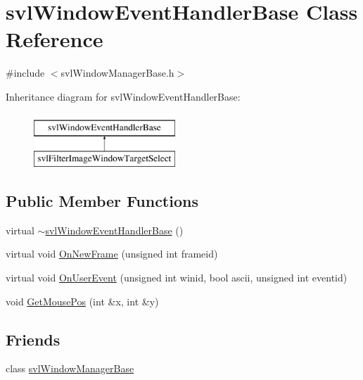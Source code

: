 \hypertarget{classsvl_window_event_handler_base}{}\section{svl\+Window\+Event\+Handler\+Base Class Reference}
\label{classsvl_window_event_handler_base}


{\ttfamily \#include $<$svl\+Window\+Manager\+Base.\+h$>$}

Inheritance diagram for svl\+Window\+Event\+Handler\+Base\+:\begin{figure}[H]
\begin{center}
\leavevmode
\includegraphics[height=2.000000cm]{d9/d07/classsvl_window_event_handler_base}
\end{center}
\end{figure}
\subsection*{Public Member Functions}
\begin{DoxyCompactItemize}
\item 
virtual \hyperlink{classsvl_window_event_handler_base_a95391de3cdacf95ebc1272720f4b5ea2}{$\sim$svl\+Window\+Event\+Handler\+Base} ()
\item 
virtual void \hyperlink{classsvl_window_event_handler_base_ac7a48aa31c692aacd378f25394e0cc17}{On\+New\+Frame} (unsigned int frameid)
\item 
virtual void \hyperlink{classsvl_window_event_handler_base_a7979367a44c5e9b21e6b9f65b1a71ecb}{On\+User\+Event} (unsigned int winid, bool ascii, unsigned int eventid)
\item 
void \hyperlink{classsvl_window_event_handler_base_a44bac8fb1d07f55703accfe47a04a971}{Get\+Mouse\+Pos} (int \&x, int \&y)
\end{DoxyCompactItemize}
\subsection*{Friends}
\begin{DoxyCompactItemize}
\item 
class \hyperlink{classsvl_window_event_handler_base_a46aa18ca3dfcb3925b69fe97f8e1c54d}{svl\+Window\+Manager\+Base}
\end{DoxyCompactItemize}


